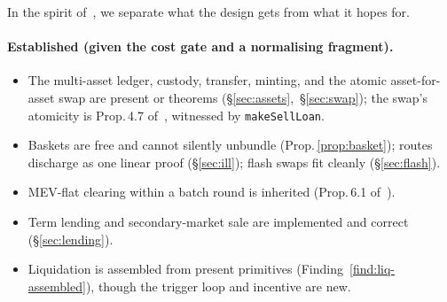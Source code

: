 \documentclass[11pt]{article}
\theoremstyle{definition}
\begin{document}
In the spirit of~\cite{ppf,predmkt}, we separate what the design gets from what it hopes for.

\paragraph{Established (given the cost gate and a normalising fragment).}
\begin{itemize}[leftmargin=1.4em]
\item The multi-asset ledger, custody, transfer, minting, and the atomic asset-for-asset swap are
present or theorems (\S\ref{sec:assets},\ \S\ref{sec:swap}); the swap's atomicity is
Prop.\,4.7 of~\cite{cost}, witnessed by \texttt{makeSellLoan}.
\item Baskets are free and cannot silently unbundle (Prop.\,\ref{prop:basket}); routes discharge as one
linear proof (\S\ref{sec:ill}); flash swaps fit cleanly (\S\ref{sec:flash}).
\item MEV-flat clearing within a batch round is inherited (Prop.\,6.1 of~\cite{predmkt}).
\item Term lending and secondary-market sale are implemented and correct (\S\ref{sec:lending}).
\item Liquidation is assembled from present primitives (Finding~\ref{find:liq-assembled}), though the
trigger loop and incentive are new.
\end{itemize}
\end{document}
